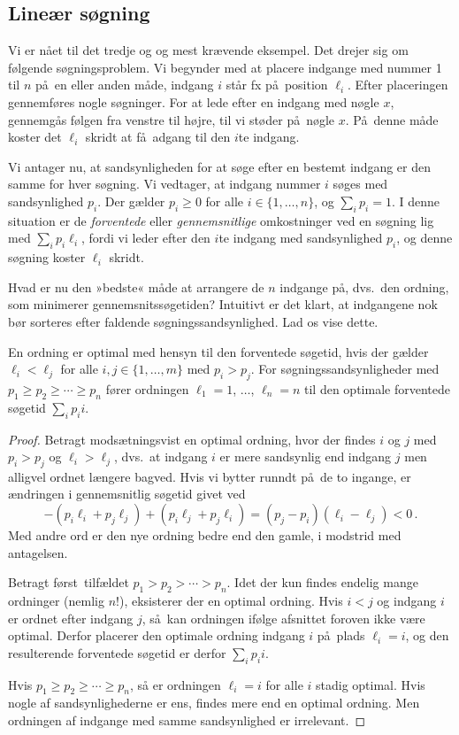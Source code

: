 \subsection{Lineær søgning}

Vi er nået til det tredje og og mest krævende eksempel.
Det drejer sig om følgende søgningsproblem.
Vi begynder med at placere indgange med nummer 1 til $n$ på en eller anden måde, indgang $i$ står fx på position $\ell_i$.
Efter placeringen gennemføres nogle søgninger.
For at lede efter en indgang med nøgle $x$, gennemgås følgen fra venstre til højre, til vi støder på nøgle $x$.
På denne måde koster det $\ell_i$ skridt at få adgang til den  $i$te indgang.   

Vi antager nu, at sandsynligheden for at søge efter en bestemt indgang er den samme for hver søgning.
Vi vedtager, at indgang nummer $i$ søges med sandsynlighed $p_i$.
Der gælder $p_i \ge 0$ for alle $i\in\{1,\ldots,  n\}$, og $\sum_i p_i = 1$.
I denne situation er de \emph{forventede} eller \emph{gennemsnitlige} omkostninger ved en søgning lig med $\sum_i p_i \ell_i$, fordi vi leder efter den $i$te indgang med sandsynlighed $p_i$, og denne søgning koster $\ell_i$ skridt. 

Hvad er nu den »bedste« måde at arrangere de $n$ indgange på, dvs.\ den ordning, som minimerer gennemsnitssøgetiden?
Intuitivt er det klart, at indgangene nok bør sorteres efter faldende søgningssandsynlighed.
Lad os vise dette.

\begin{lemma} 
  En ordning er optimal med hensyn til den forventede søgetid, hvis der gælder $\ell_i<\ell_j$ for alle $i,j\in\{1,\ldots,m\}$ med $p_i>p_j$.
  For søgningssandsynligheder med  $p_1 \ge p_2 \ge \cdots \ge p_n$ fører ordningen $\ell_1= 1$, $\ldots$, $\ell_n =n$ til den optimale forventede søgetid $\sum_i p_i i$. 
\end{lemma} 
%
\begin{proof} 
  Betragt modsætningsvist en optimal ordning, hvor der findes $i$ og $j$ med $p_i > p_j$ og $\ell_i > \ell_j$, dvs.\ at indgang $i$ er mere sandsynlig end indgang $j$ men alligvel ordnet længere bagved.
  Hvis vi bytter runndt på de to ingange, er ændringen i gennemsnitlig søgetid givet ved
  \[ - (p_i \ell_i + p_j \ell_j) + (p_i \ell_j + p_j \ell_i) = (p_j - p_i) (\ell_i - \ell_j) < 0
  \,. \]
  Med andre ord er den nye ordning bedre end den gamle, i modstrid med antagelsen.

  Betragt først tilfældet $p_1 > p_2 > \cdots > p_n$. 
  Idet der kun findes endelig mange ordninger (nemlig $n!$), eksisterer der en optimal ordning.
  Hvis $i<j$ og indgang $i$ er ordnet efter indgang $j$, så kan ordningen ifølge afsnittet foroven ikke være optimal.
  Derfor placerer den optimale ordning indgang $i$ på plads $\ell_i = i$, og den resulterende forventede søgetid er derfor $\sum_i p_i i$. 

  Hvis $p_1 \ge p_2 \ge \cdots \ge p_n$, så er ordningen $\ell_i = i$ for alle $i$ stadig optimal.
  Hvis nogle af sandsynlighederne er ens, findes mere end en optimal ordning.
  Men ordningen af indgange med samme sandsynlighed er irrelevant.
\end{proof}  

